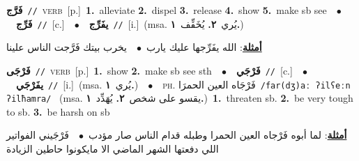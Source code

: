 \documentclass[10pt,a4paper,twoside]{article} %
\begin{document}
\begin{multicols}{2}
{\setlength\topsep{0pt}\textbf{\foreignlanguage{arabic}{فَرَّج}}\ {\color{gray}\texttt{//}\color{black}}\ \textsc{verb}\ [p.]\ \textbf{1.}~alleviate  \textbf{2.}~dispel  \textbf{3.}~release  \textbf{4.}~show  \textbf{5.}~make sb see\ \ $\bullet$\ \ \setlength\topsep{0pt}\textbf{\foreignlanguage{arabic}{فَرِّج}}\ {\color{gray}\texttt{//}\color{black}}\ [c.]\ \ $\bullet$\ \ \setlength\topsep{0pt}\textbf{\foreignlanguage{arabic}{يفَرِّج}}\ {\color{gray}\texttt{//}\color{black}}\ [i.]\ \color{gray}(msa. \foreignlanguage{arabic}{يُري}~\foreignlanguage{arabic}{\textbf{٢.}}  \foreignlanguage{arabic}{يُخَفِّف}~\foreignlanguage{arabic}{\textbf{١.}})\color{black}\  \begin{flushright}\color{gray}\foreignlanguage{arabic}{\textbf{\underline{\foreignlanguage{arabic}{أمثلة}}}: الله يفَرِّجها عليك يارب\ $\bullet$\ \  يخرب بيتك فَرَّجت الناس علينا}\end{flushright}\color{black}} \vspace{2mm}

{\setlength\topsep{0pt}\textbf{\foreignlanguage{arabic}{فَرْجَى}}\ {\color{gray}\texttt{//}\color{black}}\ \textsc{verb}\ [p.]\ \textbf{1.}~show  \textbf{2.}~make sb see sth\ \ $\bullet$\ \ \setlength\topsep{0pt}\textbf{\foreignlanguage{arabic}{فَرْجَي}}\ {\color{gray}\texttt{//}\color{black}}\ [c.]\ \ $\bullet$\ \ \setlength\topsep{0pt}\textbf{\foreignlanguage{arabic}{يفَرْجَي}}\ {\color{gray}\texttt{//}\color{black}}\ [i.]\ \color{gray}(msa. \foreignlanguage{arabic}{يُري}~\foreignlanguage{arabic}{\textbf{١.}})\color{black}\ \ $\bullet$\ \ \textsc{ph.} \color{gray} \foreignlanguage{arabic}{فَرْجَاه العين الحمرَا}\color{black}\ {\color{gray}\texttt{/{\sffamily far(dʒ)aː ʔilʕeːn ʔilħamra}/}\color{black}}\ \color{gray} (msa. \foreignlanguage{arabic}{يقسو على شخص}~\foreignlanguage{arabic}{\textbf{٢.}}  \foreignlanguage{arabic}{يُهَدِّد}~\foreignlanguage{arabic}{\textbf{١.}})\color{black}\ \textbf{1.}~threaten sb.  \textbf{2.}~be very tough to sb.  \textbf{3.}~be harsh on sb\  \begin{flushright}\color{gray}\foreignlanguage{arabic}{\textbf{\underline{\foreignlanguage{arabic}{أمثلة}}}: لما أبوه فَرْجاه العين الحمرا وطبله قدام الناس صار مؤدب\ $\bullet$\ \  فَرْجَيني الفواتير اللي دفعتها الشهر الماضي الا مايكونوا حاطين الزيادة}\end{flushright}\color{black}} \vspace{2mm}


\end{multicols}
\end{document}
